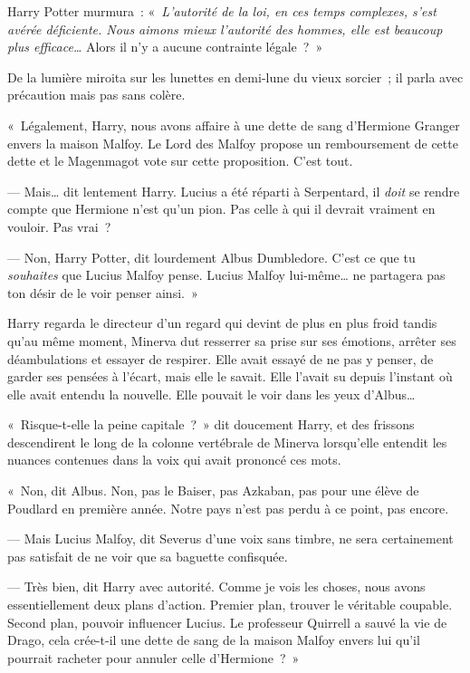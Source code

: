 Harry Potter murmura~: «~\emph{L'autorité de la loi, en ces temps complexes, s'est avérée déficiente. Nous aimons mieux l'autorité des hommes, elle est beaucoup plus efficace…} Alors il n'y a aucune contrainte légale~?~»

De la lumière miroita sur les lunettes en demi-lune du vieux sorcier~; il parla avec précaution mais pas sans colère.

«~Légalement, Harry, nous avons affaire à une dette de sang d'Hermione Granger envers la maison Malfoy. Le Lord des Malfoy propose un remboursement de cette dette et le Magenmagot vote sur cette proposition. C'est tout.

--- Mais… dit lentement Harry. Lucius a été réparti à Serpentard, il \emph{doit} se rendre compte que Hermione n'est qu'un pion. Pas celle à qui il devrait vraiment en vouloir. Pas vrai~?

--- Non, Harry Potter, dit lourdement Albus Dumbledore. C'est ce que tu \emph{souhaites} que Lucius Malfoy pense. Lucius Malfoy lui-même… ne partagera pas ton désir de le voir penser ainsi.~»

Harry regarda le directeur d'un regard qui devint de plus en plus froid tandis qu'au même moment, Minerva dut resserrer sa prise sur ses émotions, arrêter ses déambulations et essayer de respirer. Elle avait essayé de ne pas y penser, de garder ses pensées à l'écart, mais elle le savait. Elle l'avait su depuis l'instant où elle avait entendu la nouvelle. Elle pouvait le voir dans les yeux d'Albus…

«~Risque-t-elle la peine capitale~?~» dit doucement Harry, et des frissons descendirent le long de la colonne vertébrale de Minerva lorsqu'elle entendit les nuances contenues dans la voix qui avait prononcé ces mots.

«~Non, dit Albus. Non, pas le Baiser, pas Azkaban, pas pour une élève de Poudlard en première année. Notre pays n'est pas perdu à ce point, pas encore.

--- Mais Lucius Malfoy, dit Severus d'une voix sans timbre, ne sera certainement pas satisfait de ne voir que sa baguette confisquée.

--- Très bien, dit Harry avec autorité. Comme je vois les choses, nous avons essentiellement deux plans d'action. Premier plan, trouver le véritable coupable. Second plan, pouvoir influencer Lucius. Le professeur Quirrell a sauvé la vie de Drago, cela crée-t-il une dette de sang de la maison Malfoy envers lui qu'il pourrait racheter pour annuler celle d'Hermione~?~»

